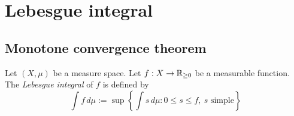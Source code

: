 \documentclass{../../large}
\begin{document}
\chapter{Lebesgue integral}
\section{Monotone convergence theorem}


\begin{prb}
Let $(X,\mu)$ be a measure space.
Let $f:X\to\mathbb{R}_{\ge0}$ be a measurable function.
The \emph{Lebesgue integral} of $f$ is defined by
\[\int f\,d\mu:=\sup\left\{\int s\,d\mu:0\le s\le f,\ \text{$s$ simple}\right\}\]
\end{prb}
\end{document}
